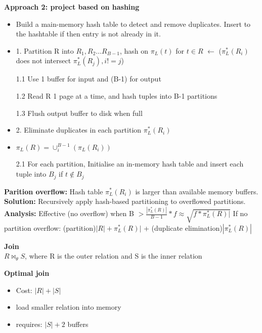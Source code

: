 \documentclass[10pt, landscape]{article}
\begin{document}
\begin{multicols}{4}
\textbf{Approach 2: project based on hashing}\\
\begin{itemize}
  \item Build a main-memory hash table to detect and remove duplicates. Insert to the hashtable if then entry is not already in it.
  \item 1. Partition R into $R_1, R_2...R_{B-1}$, hash on $\pi_L(t)$ for $t \in R$ $\leftarrow$ ($\pi^*_L(R_i)$ does not intersect $\pi^*_L(R_j), i!=j$)
  \item[1.1] Use 1 buffer for input and (B-1) for output
  \item[1.2] Read R 1 page at a time, and hash tuples into B-1 partitions
  \item[1.3] Flush output buffer to disk when full  
  \item 2. Eliminate duplicates in each partition $\pi^*_L(R_i)$
  \item $\pi_L(R)=\cup^{B-1}_i(\pi_L(R_i))$
  \item[2.1] For each partition, Initialise an in-memory hash table and insert each tuple into $B_j$ if $t \notin B_j$
\end{itemize}
\textbf{Parition overflow:} Hash table $\pi^*_L(R_i)$ is larger than available memory buffers. \newline
\textbf{Solution:} Recursively apply hash-based partitioning to overflowed partitions. \newline
\textbf{Analysis:} Effective (no overflow) when B $ > \frac{|\pi^*_L(R)|}{B-1} * f \approx \sqrt{f * \pi^*_L(R)|}$ \newline
If no partition overflow: (partition)$|R|+\pi^*_L(R)|$ + (duplicate elimination)$|\pi^*_L(R)|$ \newline


\textbf{Join} \\$R  \Join_\theta S$, where R is the outer relation and S is the inner relation




      \textbf{Optimal join} \newline
      \begin{itemize}
        \item Cost: $|R| + |S|$
        \item load smaller relation into memory
        \item requires: $|S|+2$ buffers
      \end{itemize}


\end{multicols}
\end{document}
